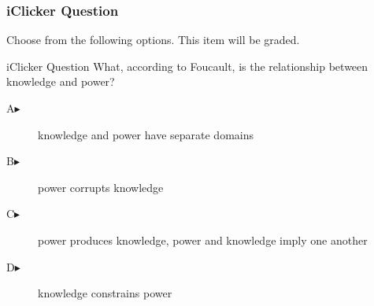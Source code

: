 \documentclass[xcolor=dvipsnames]{beamer}
\begin{document}
\begin{frame}
  \frametitle{iClicker Question}
Choose from the following options. This item will be graded.
\begin{block}{iClicker Question}
What, according to Foucault, is the relationship between knowledge and power?
\end{block}
\begin{description}
\item[A\hspace{.2in}$\blacktriangleright$] knowledge and power have separate domains
\item[B\hspace{.2in}$\blacktriangleright$] power corrupts knowledge
\item[C\hspace{.2in}$\blacktriangleright$] power produces knowledge, power and knowledge imply one another
\item[D\hspace{.2in}$\blacktriangleright$] knowledge constrains power
\end{description}
\end{frame}

\end{document}

